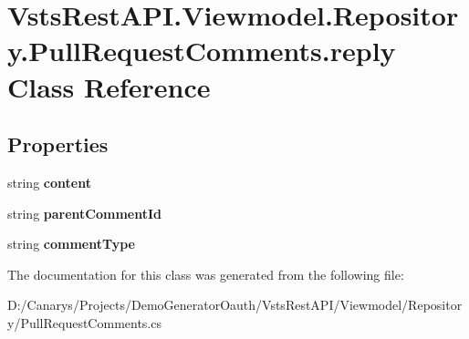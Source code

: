 \hypertarget{class_vsts_rest_a_p_i_1_1_viewmodel_1_1_repository_1_1_pull_request_comments_1_1reply}{}\section{Vsts\+Rest\+A\+P\+I.\+Viewmodel.\+Repository.\+Pull\+Request\+Comments.\+reply Class Reference}
\label{class_vsts_rest_a_p_i_1_1_viewmodel_1_1_repository_1_1_pull_request_comments_1_1reply}
\subsection*{Properties}
\begin{DoxyCompactItemize}
\item 
\mbox{\label{class_vsts_rest_a_p_i_1_1_viewmodel_1_1_repository_1_1_pull_request_comments_1_1reply_ab71585c9da0bbe4ebb31deb6f3584bdb}} 
string {\bfseries content}
\item 
\mbox{\label{class_vsts_rest_a_p_i_1_1_viewmodel_1_1_repository_1_1_pull_request_comments_1_1reply_a8af082f32397abdfbc3348ff43429b59}} 
string {\bfseries parent\+Comment\+Id}
\item 
\mbox{\label{class_vsts_rest_a_p_i_1_1_viewmodel_1_1_repository_1_1_pull_request_comments_1_1reply_a6257c7888300ae25fae38ef6f782d5fc}} 
string {\bfseries comment\+Type}
\end{DoxyCompactItemize}


The documentation for this class was generated from the following file\+:\begin{DoxyCompactItemize}
\item 
D\+:/\+Canarys/\+Projects/\+Demo\+Generator\+Oauth/\+Vsts\+Rest\+A\+P\+I/\+Viewmodel/\+Repository/Pull\+Request\+Comments.\+cs\end{DoxyCompactItemize}
